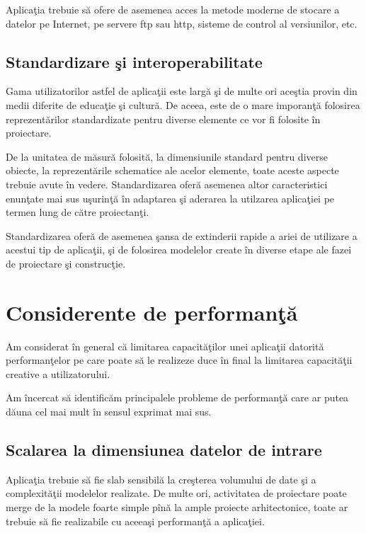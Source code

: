 Aplicaţia trebuie să ofere de asemenea acces la metode moderne de stocare a
datelor pe Internet, pe servere ftp sau http, sisteme de control al versiunilor,
etc.

\subsection{Standardizare şi interoperabilitate}

Gama utilizatorilor astfel de aplicaţii este largă şi de multe ori aceştia
provin din medii diferite de educaţie şi cultură. De aceea, este de o mare
imporanţă folosirea reprezentărilor standardizate pentru diverse elemente ce vor
fi folosite în proiectare.

De la unitatea de măsură folosită, la dimensiunile standard pentru diverse
obiecte, la reprezentările schematice ale acelor elemente, toate aceste aspecte
trebuie avute în vedere. Standardizarea oferă asemenea altor caracteristici
enunţate mai sus uşurinţă în adaptarea şi aderarea la utilzarea aplicaţiei pe
termen lung de către proiectanţi.

Standardizarea oferă de asemenea şansa de extinderii rapide a ariei de utilizare
a acestui tip de aplicaţii, şi de folosirea modelelor create în diverse etape
ale fazei de proiectare şi construcţie.

\section{Considerente de performanţă}

Am considerat în general că limitarea capacităţilor unei aplicaţii datorită
performanţelor pe care poate să le realizeze duce în final la limitarea
capacităţii creative a utilizatorului.

Am încercat să identificăm principalele probleme de performanţă care ar putea
dăuna cel mai mult în sensul exprimat mai sus.

\subsection{Scalarea la dimensiunea datelor de intrare}

Aplicaţia trebuie să fie slab sensibilă la creşterea volumului de date şi a
complexităţii modelelor realizate. De multe ori, activitatea de proiectare poate
merge de la modele foarte simple pînă la ample proiecte arhitectonice, toate ar
trebuie să fie realizabile cu aceeaşi performanţă a aplicaţiei.

